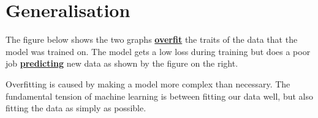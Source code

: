 \documentclass[12pt]{article}
\begin{document}
\section{Generalisation}
The figure below shows the two graphs \href{https://developers.google.com/machine-learning/glossary#overfitting}{\textbf{overfit}} the traits of the data that the model was trained on. The model gets a low loss during training but does a poor job \href{https://developers.google.com/machine-learning/glossary#prediction}{\textbf{predicting}} new data as shown by the figure on the right.
\begin{figure}[h]%
    \centering
    \qquad
    \caption{}%
\end{figure}

Overfitting is caused by making a model more complex than necessary. The fundamental tension of machine learning is between fitting our data well, but also fitting the data as simply as possible.
\end{document}
